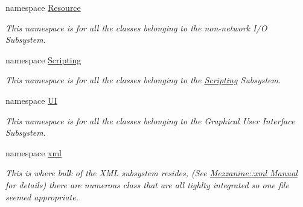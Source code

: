 \begin{DoxyCompactItemize}
\item 
namespace \hyperlink{namespaceMezzanine_1_1Resource}{Resource}


\begin{DoxyCompactList}\small\item\em This namespace is for all the classes belonging to the non-\/network I/O Subsystem. \item\end{DoxyCompactList}

\item 
namespace \hyperlink{namespaceMezzanine_1_1Scripting}{Scripting}


\begin{DoxyCompactList}\small\item\em This namespace is for all the classes belonging to the \hyperlink{namespaceMezzanine_1_1Scripting}{Scripting} Subsystem. \item\end{DoxyCompactList}

\item 
namespace \hyperlink{namespaceMezzanine_1_1UI}{UI}


\begin{DoxyCompactList}\small\item\em This namespace is for all the classes belonging to the Graphical User Interface Subsystem. \item\end{DoxyCompactList}

\item 
namespace \hyperlink{namespaceMezzanine_1_1xml}{xml}


\begin{DoxyCompactList}\small\item\em This is where bulk of the XML subsystem resides, (See \hyperlink{XMLManual}{Mezzanine::xml Manual} for details) there are numerous class that are all tighlty integrated so one file seemed appropriate. \item\end{DoxyCompactList}

\end{DoxyCompactItemize}
